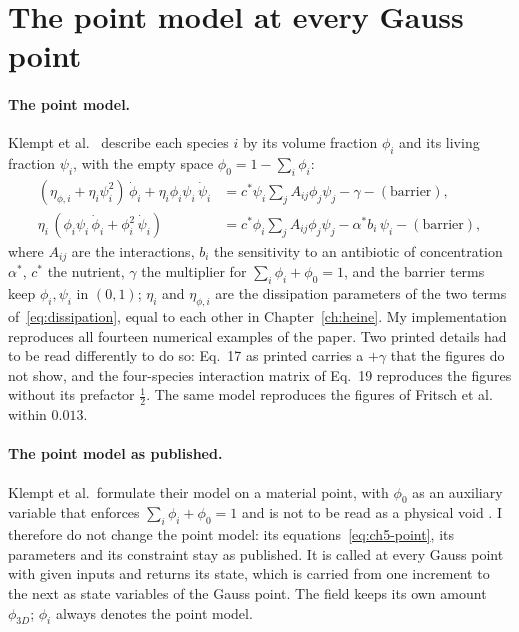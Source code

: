 \section{The point model at every Gauss point}
\label{sec:ch5-composition}

\paragraph{The point model.} Klempt et al.~\cite{Klempt2026ContinuumBacterialGrowth}
describe each species $i$ by its volume fraction $\phi_i$ and its living
fraction $\psi_i$, with the empty space $\phi_0=1-\sum_i\phi_i$:
\begin{equation}
\begin{aligned}
(\eta_{\phi,i}+\eta_i\psi_i^2)\,\dot\phi_i+\eta_i\phi_i\psi_i\,\dot\psi_i
&= c^*\psi_i\textstyle\sum_j A_{ij}\phi_j\psi_j-\gamma-(\text{barrier}),\\
\eta_i\,(\phi_i\psi_i\,\dot\phi_i+\phi_i^2\,\dot\psi_i)
&= c^*\phi_i\textstyle\sum_j A_{ij}\phi_j\psi_j-\alpha^* b_i\,\psi_i-(\text{barrier}),
\end{aligned}
\label{eq:ch5-point}
\end{equation}
where $A_{ij}$ are the interactions, $b_i$ the sensitivity to an antibiotic of
concentration $\alpha^*$, $c^*$ the nutrient, $\gamma$ the multiplier for
$\sum_i\phi_i+\phi_0=1$, and the barrier terms keep $\phi_i,\psi_i$
in $(0,1)$; $\eta_i$ and $\eta_{\phi,i}$ are the dissipation parameters of the two
terms of~\eqref{eq:dissipation}, equal to each other in Chapter~\ref{ch:heine}.
My implementation reproduces all fourteen numerical examples of the
paper. Two printed details had to be read differently to do so: Eq.~17 as
printed carries a $+\gamma$ that the figures do not show, and the four-species
interaction matrix of Eq.~19 reproduces the figures without its prefactor
$\tfrac12$. The same model reproduces the figures of Fritsch et
al.~\cite{Fritsch2025BayesianMicrofilms} within $0.013$.

\paragraph{The point model as published.}
Klempt et al.\ formulate their model on a material point, with $\phi_0$ as an auxiliary variable that
enforces $\sum_i\phi_i+\phi_0=1$ and is not to be read as a physical void
\cite{Klempt2026ContinuumBacterialGrowth}. I therefore do not change the point model: its
equations~\eqref{eq:ch5-point}, its parameters and its constraint stay as published. It is called at
every Gauss point with given inputs and returns its state, which is carried from one increment to the
next as state variables of the Gauss point. The field keeps its own amount $\phi_{3D}$; $\phi_i$ always denotes the point model.

